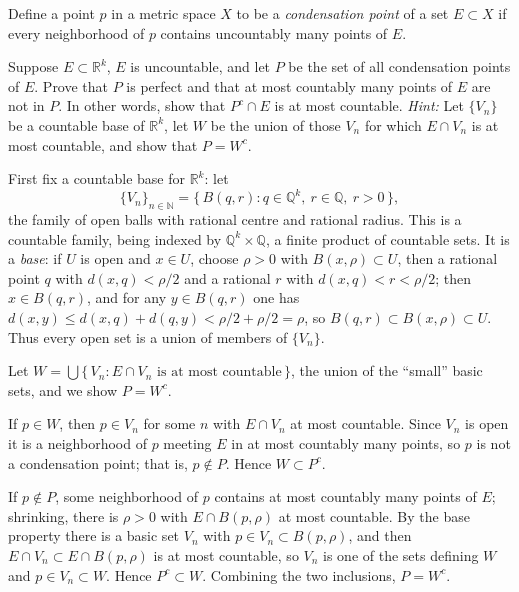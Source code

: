 \documentclass[main.tex]{subfiles}
\begin{document}
Define a point $p$ in a metric space $X$ to be a \emph{condensation point} of a set $E\subset X$ if
every neighborhood of $p$ contains uncountably many points of $E$.

Suppose $E\subset\mathbb R^{k}$, $E$ is uncountable, and let $P$ be the set of all condensation points
of $E$. Prove that $P$ is perfect and that at most countably many points of $E$ are not in $P$. In
other words, show that $P^{c}\cap E$ is at most countable. \emph{Hint:} Let $\{V_{n}\}$ be a countable
base of $\mathbb R^{k}$, let $W$ be the union of those $V_{n}$ for which $E\cap V_{n}$ is at most
countable, and show that $P=W^{c}$.

\begin{SolutionBlue}
First fix a countable base for $\mathbb R^{k}$: let
\[
\{V_n\}_{n\in\mathbb N}=\bigl\{\,B(q,r):q\in\mathbb Q^{k},\ r\in\mathbb Q,\ r>0\,\bigr\},
\]
the family of open balls with rational centre and rational radius. This is a countable family, being
indexed by $\mathbb Q^{k}\times\mathbb Q$, a finite product of countable sets. It is a \emph{base}: if
$U$ is open and $x\in U$, choose $\rho>0$ with $B(x,\rho)\subset U$, then a rational point $q$ with
$d(x,q)<\rho/2$ and a rational $r$ with $d(x,q)<r<\rho/2$; then $x\in B(q,r)$, and for any
$y\in B(q,r)$ one has $d(x,y)\le d(x,q)+d(q,y)<\rho/2+\rho/2=\rho$, so $B(q,r)\subset B(x,\rho)\subset U$.
Thus every open set is a union of members of $\{V_n\}$.

Let $W=\bigcup\{\,V_n:E\cap V_n\text{ is at most countable}\,\}$, the union of the ``small'' basic sets,
and we show $P=W^{c}$.

If $p\in W$, then $p\in V_n$ for some $n$ with $E\cap V_n$ at most countable. Since $V_n$ is open it is
a neighborhood of $p$ meeting $E$ in at most countably many points, so $p$ is not a condensation point;
that is, $p\notin P$. Hence $W\subset P^{c}$.

If $p\notin P$, some neighborhood of $p$ contains at most countably many points of $E$; shrinking, there
is $\rho>0$ with $E\cap B(p,\rho)$ at most countable. By the base property there is a basic set $V_n$
with $p\in V_n\subset B(p,\rho)$, and then $E\cap V_n\subset E\cap B(p,\rho)$ is at most countable, so
$V_n$ is one of the sets defining $W$ and $p\in V_n\subset W$. Hence $P^{c}\subset W$. Combining the two
inclusions, $P=W^{c}$.


\end{SolutionBlue}
\end{document}
